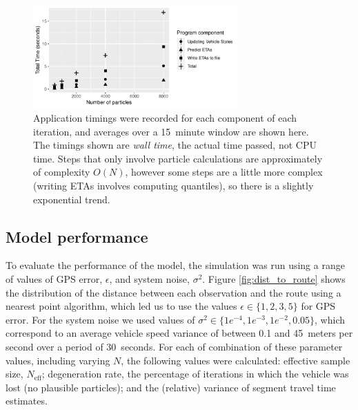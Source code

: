 \begin{figure}[tb]
    \centering
    \includegraphics[width=0.7\textwidth]{figures/04_model_results_timing.pdf}
    \caption{
        Application timings were recorded for each component of each
        iteration, and averages over a 15~minute window are shown here.
        The timings shown are \emph{wall time}, the actual time passed,
        not CPU time.
        Steps that only involve particle calculations are approximately
        of complexity $O(N)$,
        however some steps are a little more complex (writing ETAs involves computing quantiles), 
        so there is a slightly exponential trend.
    }
    \label{fig:timings}
\end{figure}




\subsection{Model performance}
\label{sec:model_perf}


To evaluate the performance of the model,
the simulation was run using a range of values of GPS error, $\epsilon$,
and system noise, $\sigma^2$.
Figure \ref{fig:dist_to_route} shows the distribution of the distance
between each observation and the route using a nearest point algorithm,
which led us to use the values $\epsilon \in \{1,2,3,5\}$ for GPS error. 
For the system noise we used values of $\sigma^2\in \{1e^{-4},1e^{-3},1e^{-2},0.05\}$,
which correspond to an average vehicle speed variance of between 0.1 and 45~meters per second
over a period of 30~seconds.
For each of combination of these parameter values, including varying $N$,
the following values were calculated:
effective sample size, $N_\text{eff}$;
degeneration rate, the percentage of iterations in which the vehicle was lost
(no plausible particles);
and the (relative) variance of segment travel time estimates.



